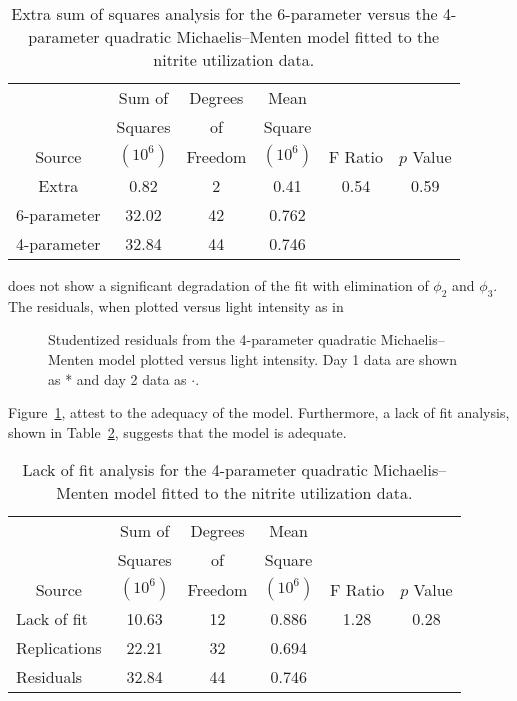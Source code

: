 \begin{table}
  \caption{
  Extra sum of squares analysis for the 6-parameter
  versus the 4-parameter quadratic Michaelis--Menten model
  fitted to the nitrite utilization data.
  }\label{tbl:3.7}
  \begin{center}
    \begin{tabular}{cccccc}\hline
      &\multicolumn{1}{c}{Sum of}&\multicolumn{1}{c}{Degrees}&
      \multicolumn{1}{c}{Mean}\\
      &\multicolumn{1}{c}{Squares} &\multicolumn{1}{c}{of}
      &\multicolumn{1}{c}{Square}\\ 
      \multicolumn{1}{c}{Source}&\multicolumn{1}{c}{$( 10^6 )$}
      &\multicolumn{1}{c}{Freedom}&\multicolumn{1}{c}{$( 10^6 )$}
      &\multicolumn{1}{c}{F Ratio} &\multicolumn{1}{c}{$p$ Value}\\ \hline
      Extra&0.82&2&0.41&0.54&0.59\\
      6-parameter&32.02&42&0.762\\ \hline
      4-parameter&32.84&44&0.746\\ \hline
    \end{tabular}
  \end{center}
\end{table}
does not show a significant degradation of the fit with
elimination of $\phi_{2}$ and $\phi_{3}$.
The residuals, when plotted versus light intensity as in
\begin{figure}
  \vspace{3in}
  \caption{Studentized residuals from the 4-parameter quadratic
    Michaelis--Menten model plotted versus light intensity.  Day 1
    data are shown as * and day 2 data as $\cdot$.}
  \label{fig:NITres3}
\end{figure}
Figure~\ref{fig:NITres3}, attest to the adequacy of the model.
Furthermore, a lack of fit analysis, shown in
Table~\ref{tbl:qmic4lof}, suggests that the model is adequate.
\begin{table}
  \caption{Lack of fit analysis for the 4-parameter quadratic
    Michaelis--Menten model fitted to the nitrite utilization data.}
  \label{tbl:qmic4lof}
  \begin{center}
    \begin{tabular}{lccccc}\hline
      &\multicolumn{1}{c}{Sum of}&\multicolumn{1}{c}{Degrees}
      &\multicolumn{1}{c}{Mean}\\
      &\multicolumn{1}{c}{Squares} &\multicolumn{1}{c}{of} &
      \multicolumn{1}{c}{Square}\\
      \multicolumn{1}{c}{Source} & \multicolumn{1}{c}{$( 10^6 )$}
      &\multicolumn{1}{c}{Freedom} & \multicolumn{1}{c}{$( 10^6 )$} &
      \multicolumn{1}{c}{F Ratio} & \multicolumn{1}{c}{$p$ Value}\\ \hline
      Lack of fit&10.63&12&0.886&1.28&0.28\\
      Replications&22.21&32&0.694\\ \hline
      Residuals&32.84&44&0.746\\ \hline
    \end{tabular}
  \end{center}
\end{table}

